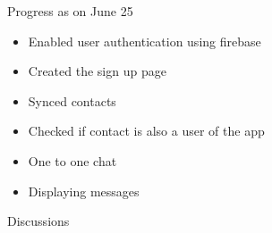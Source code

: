 \documentclass{beamer}
\begin{document}
\begin{frame}{Progress as on June 25}
\begin{itemize}
\item Enabled user authentication using firebase
\item Created the sign up page
\item Synced contacts
\item Checked if contact is also a user of the app
\item One to one chat
\item Displaying messages
\end{itemize}
\end{frame}
\begin{frame}{Discussions}
\end{frame}
\end{document}
